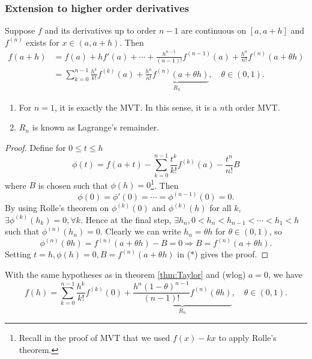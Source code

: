 \subsubsection*{Extension to higher order derivatives}
\begin{theorem}\label{thm:Taylor}
    Suppose $f$ and its derivatives up to order $n-1$ are continuous on $[a,a+h]$ and $ f^{(n)} $ exists for $ x\in (a,a+h) $. Then 
    \begin{align*}
        f(a+h) &= f(a)+hf'(a) +\cdots+\frac{h^{n-1}}{(n-1)!}f^{(n-1)}(a)+\frac{h^n}{n!}f^{(n)}(a+\theta h)\\ 
        &= \sum_{k=0}^{n-1}\frac{h^k}{k!}f^{(k)}(a)+ \underbrace{\frac{h^n}{n!}f^{(n)}(a+\theta h)}_{R_n} ,\quad \theta\in (0,1).
    \end{align*}
\end{theorem}
\begin{note}
    \begin{enumerate}
        \item For $n=1$, it is exactly the MVT. In this sense, it is a $n$th order MVT.
        \item $R_n$ is known as Lagrange's remainder.
    \end{enumerate}
\end{note}
\begin{proof}
    Define for $0\le t\le h$
    \[
        \phi(t) = f(a+t)-\sum_{k=0}^{n-1}\frac{t^k}{k!}f^{(k)}(a)-\frac{t^n}{n!}B\tag{$*$}
    \]
    where $B$ is chosen such that $\phi(h)=0$\footnote{Recall in the proof of MVT that we used $ f(x)-kx $ to apply Rolle's theorem.}. Then 
    \[
        \phi(0) = \phi'(0)= \cdots = \phi^{(n-1)}(0)=0.
    \]
    By using Rolle's theorem on $ \phi^{(k)}(0) $ and $ \phi^{(k)}(h) $ for all $k$, $ \exists \phi^{(k)}(h_k)=0, \forall k $. Hence at the final step, $ \exists h_n, 0<h_n<h_{n-1}<\cdots<h_1<h $ such that $ \phi^{(n)}(h_n)=0 $. Clearly we can write $ h_n = \theta h $ for $ \theta\in (0,1) $, so 
    \[
        \phi^{(n)}(\theta h) = f^{(n)}(a+\theta h)-B=0 \Longrightarrow B=f^{(n)}(a+\theta h).
    \]
    Setting $ t=h,\phi(h)=0, B=f^{(n)}(a+\theta h) $ in ($*$) gives the proof.
\end{proof}

\begin{theorem}\label{thm:Taylor,Cauchy remainder}
    With the same hypotheses as in theorem \ref{thm:Taylor} and (wlog) $a=0$, we have 
    \[
        f(h) = \sum_{k=0}^{n-1}\frac{h^k}{k!}f^{(k)}(0)+\underbrace{\frac{h^n(1-\theta)^{n-1}}{(n-1)!}f^{(n)}(\theta h)}_{R_n},\quad \theta\in (0,1).
    \]
\end{theorem}

